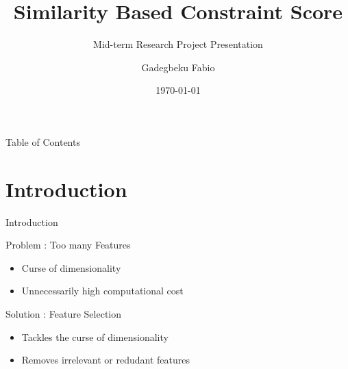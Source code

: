 \documentclass{beamer}
\title{\textbf{Similarity Based Constraint Score}}
\subtitle{Mid-term Research Project Presentation}
\author{Gadegbeku Fabio}
\date{\today}
\begin{document}
\begin{frame}
  \titlepage
  \begin{center}
    \hspace{0.2cm}
    \hspace{0.2cm}
    \par
  \end{center}
\end{frame}

\begin{frame}{Table of Contents}
  \tableofcontents
\end{frame}

\section{Introduction}

\begin{frame}{Introduction}
    \begin{block}{Problem : Too many Features}
        \begin{itemize}
            \item Curse of dimensionality
            \item Unnecessarily high computational cost
        \end{itemize}
    \end{block}
\vspace*{1cm}
    \begin{block}{Solution : Feature Selection}
        \begin{itemize}
            \item Tackles the curse of dimensionality
            \item Removes irrelevant or redudant features
        \end{itemize}
    \end{block}
\end{frame}
\end{document}
